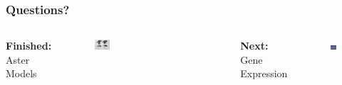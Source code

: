 \documentclass[table]{beamer}
\begin{document}
\begin{frame}
  \frametitle{Questions?}
\begin{columns}[t] %

  \textbf{Finished:}\\
  Aster Models
\begin{figure}
\includegraphics[width=0.8\linewidth]{finches.jpg}
\end{figure}

  \textbf{}\\
\begin{figure}
\end{figure}

  \textbf{Next:}\\
  Gene Expression
\begin{figure}
\includegraphics[width=0.8\linewidth]{DNA.jpg}
\end{figure}
\end{columns}
\end{frame}
\end{document}
